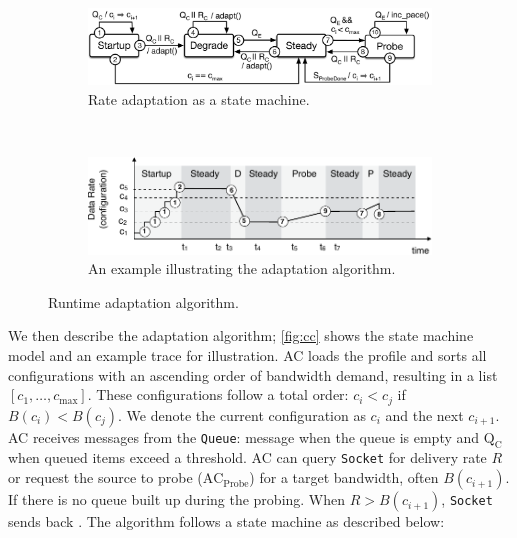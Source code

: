 \begin{figure}
  \begin{subfigure}[t]{\columnwidth}
    \centering
    \includegraphics[width=\columnwidth]{figures/cc.pdf}
    \caption{Rate adaptation as a state machine.}
    \vspace{1em}
    \label{fig:cc-sm}
  \end{subfigure}
  \\
  \centering
  \begin{subfigure}[t]{0.9\columnwidth}
    \centering
    \includegraphics[width=\columnwidth]{figures/cc2.pdf}
    \caption{An example illustrating the adaptation algorithm.}
    \label{fig:cc-ex}
  \end{subfigure}
  \caption{Runtime adaptation algorithm.}
  \label{fig:cc}
\end{figure}

We then describe the adaptation algorithm; \autoref{fig:cc} shows the state
machine model and an example trace for illustration.  AC loads the profile and
sorts all configurations with an ascending order of bandwidth demand, resulting
in a list $[c_1, \dots, c_{\max}]$.  These configurations follow a total order:
$c_i < c_j$ if $B(c_i) < B(c_j)$.  We denote the current configuration as $c_i$
and the next $c_{i+1}$.  AC receives messages from the \texttt{Queue}: message
\qe{} when the queue is empty and $\text{Q}_\text{C}$ when queued items exceed a
threshold. AC can query \texttt{Socket} for delivery rate $R$ or request the
source to probe ($\text{AC}_{\text{Probe}}$) for a target bandwidth, often
$B(c_{i+1})$. If there is no queue built up during the probing.  When
$R > B(c_{i+1})$, \texttt{Socket} sends back \spd{}. The algorithm follows a
state machine as described below:

